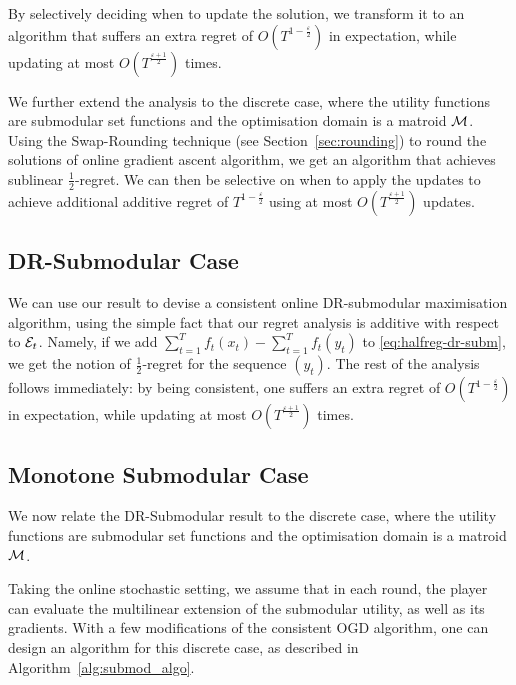  
By selectively deciding when to update the solution, we transform it to an algorithm that suffers an extra regret of $O(T^{1-\frac{\varepsilon}{2}})$ in expectation, while updating at most $O(T^{\frac{\varepsilon + 1}{2}})$ times.

We further extend the analysis to the discrete case, where the utility functions are submodular set functions and the optimisation domain is a matroid $\mathcal{M}$. Using the Swap-Rounding technique (see Section~\ref{sec:rounding}) to round the solutions of online gradient ascent algorithm, we get an algorithm  that achieves sublinear $\frac{1}{2}$-regret. We can then be selective on when to apply the updates to achieve additional additive regret of $T^{1 - \frac{\varepsilon}{2}}$ using at most $O(T^{\frac{\varepsilon + 1}{2}})$ updates. 


\subsection*{DR-Submodular Case} 
We can use our result to devise a consistent online DR-submodular maximisation algorithm, using the simple fact that our regret analysis is additive with respect to $\mathcal{E}_t$. Namely, if we add $\sum_{t=1}^T f_t(x_t) - \sum_{t=1}^T f_t(y_t)$ to \eqref{eq:halfreg-dr-subm}, we get the notion of $\frac{1}{2}$-regret for the sequence $(y_t)$. The rest of the analysis follows immediately: by being consistent, one suffers an extra regret of $O(T^{1-\frac{\varepsilon}{2}})$ in expectation, while updating at most $O(T^{\frac{\varepsilon + 1}{2}})$ times.

\subsection*{Monotone Submodular Case} We now relate the DR-Submodular result to the discrete case, where the utility functions are submodular set functions and the optimisation domain is a matroid $\mathcal{M}$. 

Taking the online stochastic setting, we assume that in each round, the player can evaluate the multilinear extension of the submodular utility, as well as its gradients. With a few modifications of the consistent OGD algorithm, one can design an algorithm for this discrete case, as described in Algorithm~\ref{alg:submod_algo}.

